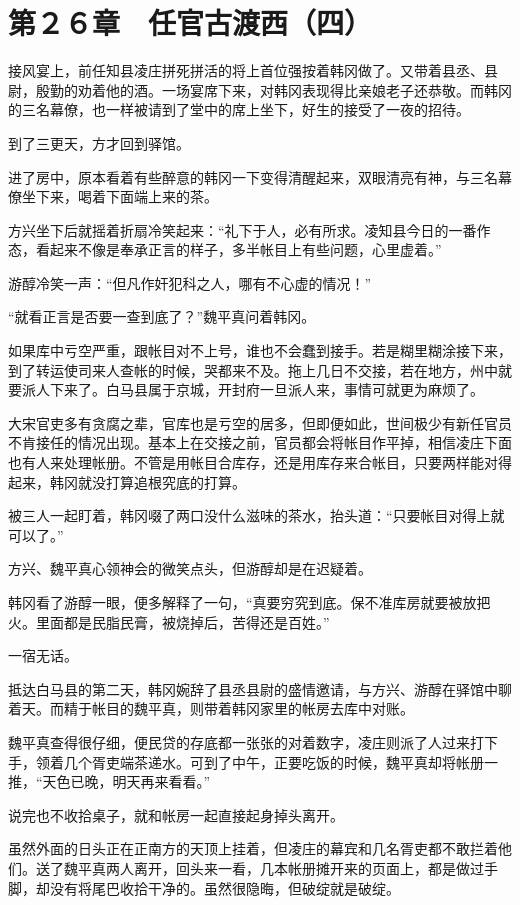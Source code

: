 \section{第２６章　任官古渡西（四）}

接风宴上，前任知县凌庄拼死拼活的将上首位强按着韩冈做了。又带着县丞、县尉，殷勤的劝着他的酒。一场宴席下来，对韩冈表现得比亲娘老子还恭敬。而韩冈的三名幕僚，也一样被请到了堂中的席上坐下，好生的接受了一夜的招待。

到了三更天，方才回到驿馆。

进了房中，原本看着有些醉意的韩冈一下变得清醒起来，双眼清亮有神，与三名幕僚坐下来，喝着下面端上来的茶。

方兴坐下后就摇着折扇冷笑起来：“礼下于人，必有所求。凌知县今日的一番作态，看起来不像是奉承正言的样子，多半帐目上有些问题，心里虚着。”

游醇冷笑一声：“但凡作奸犯科之人，哪有不心虚的情况！”

“就看正言是否要一查到底了？”魏平真问着韩冈。

如果库中亏空严重，跟帐目对不上号，谁也不会蠢到接手。若是糊里糊涂接下来，到了转运使司来人查帐的时候，哭都来不及。拖上几日不交接，若在地方，州中就要派人下来了。白马县属于京城，开封府一旦派人来，事情可就更为麻烦了。

大宋官吏多有贪腐之辈，官库也是亏空的居多，但即便如此，世间极少有新任官员不肯接任的情况出现。基本上在交接之前，官员都会将帐目作平掉，相信凌庄下面也有人来处理帐册。不管是用帐目合库存，还是用库存来合帐目，只要两样能对得起来，韩冈就没打算追根究底的打算。

被三人一起盯着，韩冈啜了两口没什么滋味的茶水，抬头道：“只要帐目对得上就可以了。”

方兴、魏平真心领神会的微笑点头，但游醇却是在迟疑着。

韩冈看了游醇一眼，便多解释了一句，“真要穷究到底。保不准库房就要被放把火。里面都是民脂民膏，被烧掉后，苦得还是百姓。”

一宿无话。

抵达白马县的第二天，韩冈婉辞了县丞县尉的盛情邀请，与方兴、游醇在驿馆中聊着天。而精于帐目的魏平真，则带着韩冈家里的帐房去库中对账。

魏平真查得很仔细，便民贷的存底都一张张的对着数字，凌庄则派了人过来打下手，领着几个胥吏端茶递水。可到了中午，正要吃饭的时候，魏平真却将帐册一推，“天色已晚，明天再来看看。”

说完也不收拾桌子，就和帐房一起直接起身掉头离开。

虽然外面的日头正在正南方的天顶上挂着，但凌庄的幕宾和几名胥吏都不敢拦着他们。送了魏平真两人离开，回头来一看，几本帐册摊开来的页面上，都是做过手脚，却没有将尾巴收拾干净的。虽然很隐晦，但破绽就是破绽。

